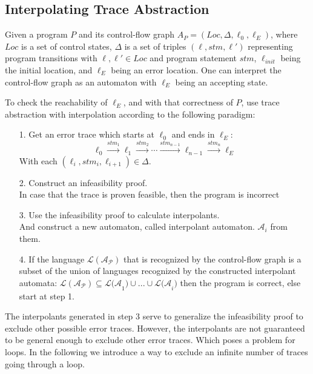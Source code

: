\documentclass{article}
\begin{document}
\subsection{Interpolating Trace Abstraction}
Given a program $P$ and its control-flow graph $A_P = (Loc, \Delta, \ell_{0}, \ell_E)$, where $Loc$ is a set of control states, $\Delta$ is a set of triples $(\ell, stm, \ell')$ representing program transitions with $\ell, \ell' \in Loc$ and program statement $stm$, $\ell_{init}$ being the initial location, and $\ell_E$ being an error location. One can interpret the control-flow graph as an automaton with $\ell_E$ being an accepting state. \par To check the reachability of $\ell_E$, and with that correctness of $P$, use trace abstraction with interpolation according to the following paradigm:
\begin{itemize}
	\item[1.] Get an error trace which starts at $\ell_0$ and ends in $\ell_E$:
	\begin{equation*}
			 \ell_{0} \xrightarrow{\text{$stm_1$}} \ell_1 \xrightarrow{\text{$stm_2$}} \cdots \xrightarrow{\text{$stm_{n-1}$}} \ell_{n-1} \xrightarrow{\text{$stm_{n}$}} \ell_{E}
	\end{equation*}
	With each $(\ell_i, stm_i, \ell_{i + 1}) \in \Delta$.
	\item[2.] Construct an infeasibility proof. \\ In case that the trace is proven feasible, then the program is incorrect
	\item[3.] Use the infeasibility proof to calculate interpolants. \\
	And construct a new automaton, called interpolant automaton. $\mathcal{A}_i$ from them.
	\item[4.] If the language $\mathcal{L(A_P)}$ that is recognized by the control-flow graph is a subset of the union of languages recognized by the constructed interpolant automata: $\mathcal{L(A_P)} \subseteq \mathcal{L(A}_1) \cup ... \cup \mathcal{L(A}_i)$ then the program is correct, else start at step 1.
\end{itemize}
The interpolants generated in step 3 serve to generalize the infeasibility proof to exclude other possible error traces. However, the interpolants are not guaranteed to be general enough to exclude other error traces. Which poses a problem for loops. In the following we introduce a way to exclude an infinite number of traces going through a loop.
\end{document}

